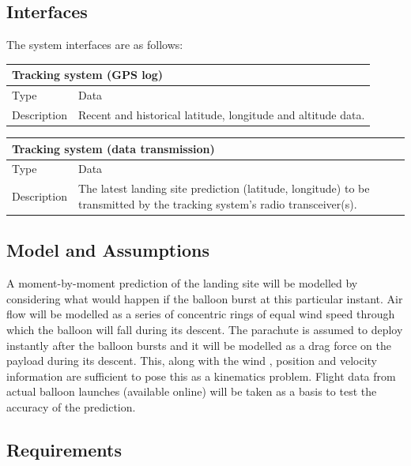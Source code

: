 \documentclass[11pt]{article}
\begin{document}
\subsection{Interfaces}

The system interfaces are as follows:

\begin{table}[!htbp] \centering
 \begin{tabular}{|p{2cm} | p{11cm}|}
 \hline
  \multicolumn{2}{|l|}{Tracking system (GPS log)} \\
  \hline
  Type & Data \\
  \hline
  Description & Recent and historical latitude, longitude and altitude data.  \\
  \hline
 \end{tabular}
\end{table}

\begin{table}[!h] \centering
 \begin{tabular}{|p{2cm} | p{11cm}|}
 \hline
  \multicolumn{2}{|l|}{Tracking system (data transmission)} \\
  \hline
  Type & Data \\
  \hline
  Description & The latest landing site prediction (latitude, longitude) to be transmitted by the tracking system’s radio transceiver(s). \\
  \hline
 \end{tabular}
\end{table}

\subsection{Model and Assumptions}

A moment-by-moment prediction of the landing site will be modelled by considering what would happen if the balloon burst at this particular instant. Air flow will be modelled as a series of concentric rings of equal wind speed through which the balloon will fall during its descent. The parachute is assumed to deploy instantly after the balloon bursts and it will be modelled as a drag force on the payload during its descent. This, along with the wind , position and velocity information are sufficient to pose this as a kinematics problem. Flight data from actual balloon launches (available online) will be taken as a basis to test the accuracy of the prediction.

\subsection{Requirements}
\end{document}
